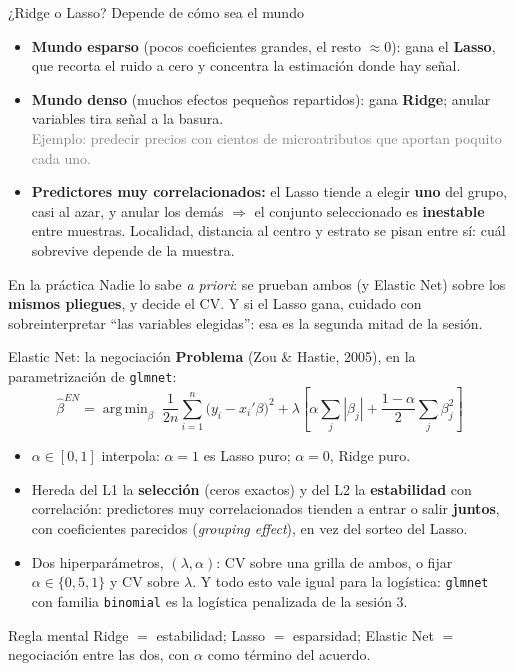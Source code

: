 \documentclass{beamer}
\newcommand{\1}{\mathbb{I}}
\DeclareMathOperator*{\argmin}{arg\,min}
\begin{document}
\begin{frame}{¿Ridge o Lasso? Depende de cómo sea el mundo}
\small
\begin{itemize}\itemsep5pt
  \item \textbf{Mundo esparso} (pocos coeficientes grandes, el resto $\approx 0$): gana el \textbf{Lasso}, que recorta el ruido a cero y concentra la estimación donde hay señal. \pause
  \item \textbf{Mundo denso} (muchos efectos pequeños repartidos): gana \textbf{Ridge}; anular variables tira señal a la basura. \\ \textcolor{gray}{Ejemplo: predecir precios con cientos de microatributos que aportan poquito cada uno.} \pause
  \item \textbf{Predictores muy correlacionados:} el Lasso tiende a elegir \textbf{uno} del grupo, casi al azar, y anular los demás $\Rightarrow$ el conjunto seleccionado es \textbf{inestable} entre muestras. Localidad, distancia al centro y estrato se pisan entre sí: cuál sobrevive depende de la muestra. \pause
\end{itemize}
\vspace{0.1cm}
\begin{block}{En la práctica}
Nadie lo sabe \emph{a priori}: se prueban ambos (y Elastic Net) sobre los \textbf{mismos pliegues}, y decide el CV. Y si el Lasso gana, cuidado con sobreinterpretar ``las variables elegidas'': esa es la segunda mitad de la sesión.
\end{block}
\end{frame}

\begin{frame}{Elastic Net: la negociación}
\small
\textbf{Problema} (Zou \& Hastie, 2005), en la parametrización de \texttt{glmnet}:
\[ \hat{\beta}^{EN} = \argmin_{\beta} \; \frac{1}{2n}\sum_{i=1}^n \big(y_i - x_i'\beta\big)^2 + \lambda \left[ \alpha \sum_j |\beta_j| + \frac{1-\alpha}{2} \sum_j \beta_j^2 \right] \]
\pause
\begin{itemize}\itemsep4pt
  \item $\alpha \in [0,1]$ interpola: $\alpha = 1$ es Lasso puro; $\alpha = 0$, Ridge puro.
  \item Hereda del L1 la \textbf{selección} (ceros exactos) y del L2 la \textbf{estabilidad} con correlación: predictores muy correlacionados tienden a entrar o salir \textbf{juntos}, con coeficientes parecidos (\emph{grouping effect}), en vez del sorteo del Lasso. \pause
  \item Dos hiperparámetros, $(\lambda, \alpha)$: CV sobre una grilla de ambos, o fijar $\alpha \in \{0{,}5, 1\}$ y CV sobre $\lambda$. Y todo esto vale igual para la logística: \texttt{glmnet} con familia \texttt{binomial} es la logística penalizada de la sesión 3.
\end{itemize}
\pause
\begin{block}{Regla mental}
Ridge $=$ estabilidad; Lasso $=$ esparsidad; Elastic Net $=$ negociación entre las dos, con $\alpha$ como término del acuerdo.
\end{block}
\end{frame}
\end{document}
